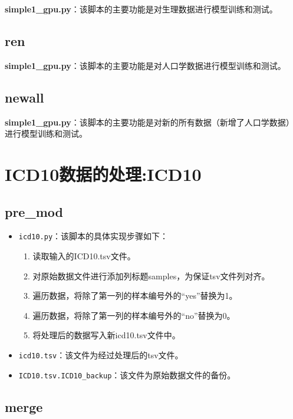 \documentclass[UTF8]{report}
\theoremstyle{MyLineTheoremStyle} %
\theoremstyle{MyBlockTheoremStyle} %
\theoremstyle{MySubsubsectionStyle} %
\begin{document}
\textbf{simple1\_gpu.py}：该脚本的主要功能是对生理数据进行模型训练和测试。

\subsection*{ren}

\textbf{simple1\_gpu.py}：该脚本的主要功能是对人口学数据进行模型训练和测试。


\subsection*{newall}

\textbf{simple1\_gpu.py}：该脚本的主要功能是对新的所有数据（新增了人口学数据）进行模型训练和测试。



\section{ICD10数据的处理:ICD10}

\subsection*{pre\_mod}

\begin{itemize}
    \item \texttt{icd10.py}：该脚本的具体实现步骤如下：
    \begin{enumerate}
        \item 读取输入的ICD10.tsv文件。
        \item 对原始数据文件进行添加列标题samples，为保证tsv文件列对齐。
        \item 遍历数据，将除了第一列的样本编号外的“yes”替换为1。
        \item 遍历数据，将除了第一列的样本编号外的“no”替换为0。
        \item 将处理后的数据写入新icd10.tsv文件中。
    \end{enumerate}
    \item \texttt{icd10.tsv}：该文件为经过处理后的tsv文件。
    \item \texttt{ICD10.tsv.ICD10\_backup}：该文件为原始数据文件的备份。
\end{itemize}


\subsection*{merge}
\end{document}
